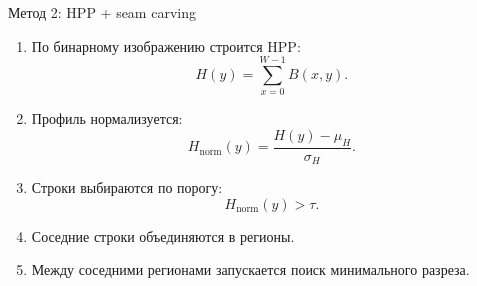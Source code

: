 \documentclass[12pt,pdf,hyperref={unicode}]{beamer}
\begin{document}
\begin{frame}{Метод 2: HPP + seam carving}

\small

\vspace{1mm}

\begin{enumerate}
    \item По бинарному изображению строится HPP:
    \[
        H(y)=\sum_{x=0}^{W-1} B(x,y).
    \]
    \item Профиль нормализуется:
    \[
        H_{\text{norm}}(y)=
        \frac{H(y)-\mu_H}{\sigma_H}.
    \]
    \item Строки выбираются по порогу:
    \[
        H_{\text{norm}}(y) > \tau.
    \]
    \item Соседние строки объединяются в регионы.
    \item Между соседними регионами запускается поиск минимального разреза.
\end{enumerate}

\let\thefootnote\relax
{}

\vspace{1mm}


\end{frame}
\end{document}
